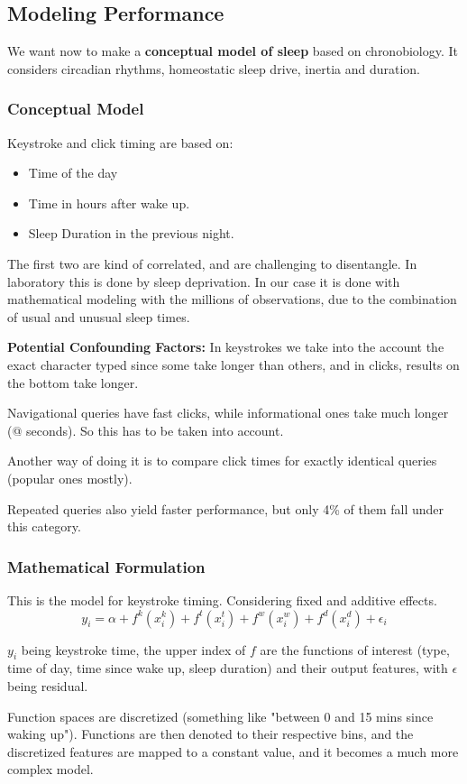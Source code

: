\documentclass{IEEEtran}
\begin{document}
    \subsection{Modeling Performance}
      We want now to make a \textbf{conceptual model of sleep} based on chronobiology. It considers circadian rhythms, homeostatic sleep drive, inertia and duration. 
      \subsubsection{Conceptual Model}
        Keystroke and click timing are based on:
        \begin{itemize}
          \item Time of the day
          \item Time in hours after wake up. 
          \item Sleep Duration in the previous night.
        \end{itemize}
        The first two are kind of correlated, and are challenging to disentangle. In laboratory this is done by sleep deprivation. In our case it is done with mathematical modeling with the millions of observations, due to the combination of usual and unusual sleep times. \par 
        \textbf{Potential Confounding Factors:} In keystrokes we take into the account the exact character typed since some take longer than others, and in clicks, results on the bottom take longer. \par 
        Navigational queries have fast clicks, while informational ones take much longer (@ seconds). So this has to be taken into account. \par 
        Another way of doing it is to compare click times for exactly identical queries (popular ones mostly). \par 
        Repeated queries also yield faster performance, but only 4\% of them fall under this category. 
      \subsubsection{Mathematical Formulation}
        This is the model for keystroke timing. Considering fixed and additive effects.
        $$y_i=\alpha+f^k(x^k_i)+f^t(x^t_i)+f^w(x^w_i)+f^d(x^d_i)+\epsilon_i$$
        \par $y_i$ being keystroke time, the upper index of $f$ are the functions of interest (type, time of day, time since wake up, sleep duration) and their output features, with $\epsilon$ being residual. \par 
        Function spaces are discretized (something like "between 0 and 15 mins since waking up"). Functions are then denoted to their respective bins, and the discretized features are mapped to a constant value, and it becomes a much more complex model.
\end{document}
